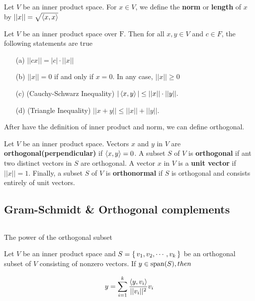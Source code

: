 \newpage

\begin{defn}
	Let $V$ be an inner product space. For $x \in V$, we define the \textbf{norm} or \textbf{length} of $x$ by $||x|| = \sqrt{\left< x,x \right>}$
\end{defn}

\begin{thm*}
	Let $V$ be an inner product space over $\mathrm F$. Then for all $x,y \in V$ and $c \in F$, the following statements are true
	
	\begin{enumerate}
		\item[(a)] $||cx|| = |c|\cdot||x||$
		\item[(b)] $||x|| = 0$ if and only if $x = 0$. In any case, $||x|| \geq 0$
		\item[(c)] (Cauchy-Schwarz Inequality) $|\left< x,y \right>| \leq ||x||\cdot||y||.$
		\item[(d)] (Triangle Inequality) $||x+y|| \leq ||x|| + ||y||.$
	\end{enumerate}
\end{thm*}

\begin{tcolorbox}
	After have the definition of inner product and norm, we can define orthogonal.
\end{tcolorbox}


\begin{defn}
	Let $V$ be an inner product space. Vectors $x$ and $y$ in $V$ are \textbf{orthogonal(perpendicular)} if $\left< x,y \right> = 0$. A subset $S$ of $V$ is \textbf{orthogonal} if ant two distinct vectors in $S$ are orthogonal. A vector $x$ in $V$ is a \textbf{unit vector} if $||x|| = 1$. Finally, a subset $S$ of $V$ is \textbf{orthonormal} if $S$ is orthogonal and consists entirely of unit vectors.
\end{defn}

\subsection{Gram-Schmidt \& Orthogonal complements} $ $

\begin{tcolorbox}
	The power of the orthogonal subset
\end{tcolorbox}

\begin{thm*}
	Let $V$ be an inner product space and $S = \left\{ \,v_1,v_2,\cdots,v_k \,\right\}$ be an orthogonal subset of $V$ consisting of nonzero vectors. If $y \in \text{span($S$)}, then$
	
	$$y = \sum^k_{i=1}\dfrac{\left< y,v_i \right>}{||v_i||^2}v_i$$
\end{thm*}

